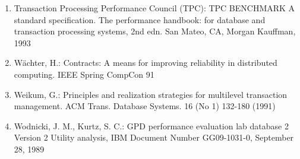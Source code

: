 \documentclass[a4paper,11pt,notitlepage,twoside,openright]{article}
\begin{document}
\begin{enumerate}
  (No 3) 256---267 (1976)
\item
  Transaction Processing Performance Council (TPC): TPC BENCHMARK A
  standard specification. The performance handbook: for database and
  transaction processing systems, 2nd edn. San Mateo, CA, Morgan
  Kauffman, 1993
\item
  Wächter, H.: Contracts: A means for improving reliability in
  distributed computing. IEEE Spring CompCon 91
\item
  Weikum, G.: Principles and realization strategies for multilevel
  transaction management. ACM Trans. Database Systems. 16 (No 1) 132-180
  (1991)
\item
  Wodnicki, J. M., Kurtz, S. C.: GPD performance evaluation lab database
  2 Version 2 Utility analysis, IBM Document Number GG09-1031-0,
  September 28, 1989
\end{enumerate}
\end{document}
